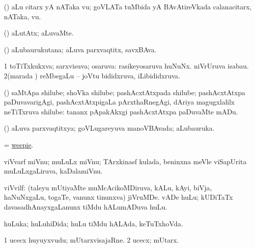 \bentry
{} 
\gl{\nA}
\bmng
(\AmA) aLu citarx yA nATaka \mo vu; goVLATa tuMbida yA BAvAtireVkada calanacitarx, nATaka, \mo vu. 
\emng
\eentry

\bentry
{} 
\gl{\kirxvi}
\expl{}
\bmng
(\AmA) aLutAtx; aLuvaMte. 
\emng
\eentry

\bentry
{} 
\gl{\nA}
\expl{}
\bmng
(\AmA) aLubaurukutana; aLuva parxvaqtitx, savxBAva. 
\emng
\eentry

\bentry
{} 
\gl{\gu}
\expl{}
\bmng
\bnum
\num{1} toTiTxkukxva; sarxvisuva; osaruva:  rasikeyosaruva huNuNx.  niVrUruva isabau. 
\num{2}(marada \vi) reMbegaLu -- joVtu bididxruva, iLibididxruva. 
\enum
\emng
\eentry

\bentry
{} 
\gl{\nA}
\expl{}
\bmng
(\ca) saMtApa shilube; shoVka shilube; pashAcxtAtxpada shilube; pashAcxtAtxpa paDuvavarigAgi, pashAcxtAtxpigaLa pArxthaRnegAgi, dAriya magugxlalilx neTiTxruva shilube:  tananx pApakAkxgi pashAcxtAtxpa paDuvaMte mADu. 
\emng
\eentry

\bentry
{} 
\gl{\gu}
\bmng
(\AmA) aLuva parxvaqtitxya; goVLugareyuva manoVBAvada; aLubauruka. 
\emng
\eentry

\bentry
{} 
\gl{\nA}
\expl{}
\bmng
= \hyperlink{weepie}{weepie}. 
\emng
\eentry

\bentry
{} 
\gl{\nA}
\expl{}
\bmng
viVvarf miVnu; muLuLx miVnu; TArxkinasf kulada, beninxna meVle viSapUrita muLuLxgaLiruva, kaDalamiVnu. 
\emng
\eentry

\bentry
{} 
\gl{\nA}
\expl{}
\bmng
viVvilf: 
\banum
{} (taleyu mUtiyaMte muMcAcikoMDiruva, kALu, kAyi, biVja, haNuNxgaLu, togaTe, \mo vanunx tinunxva) jiVruMDe.  
 vADe huLu; kUDiTaTx davasadhAnayxgaLanunx tiMdu hALumADuva huLu. 
\eanum
\emng
\eentry

\bentry
{} 
\gl{\gu}
\expl{}
\bmng
huLuka; huLuhiDida; huLu tiMdu hALAda, keTuTxhoVda. 
\emng
\eentry

\bentry
{} 
\gl{\nA}
\expl{}
\bmng
\bnum
\num{1} ucecx huyuyxvudu; mUtarxvisajaRne. 
\num{2} ucecx; mUtarx. 
\enum
\emng
\eentry

